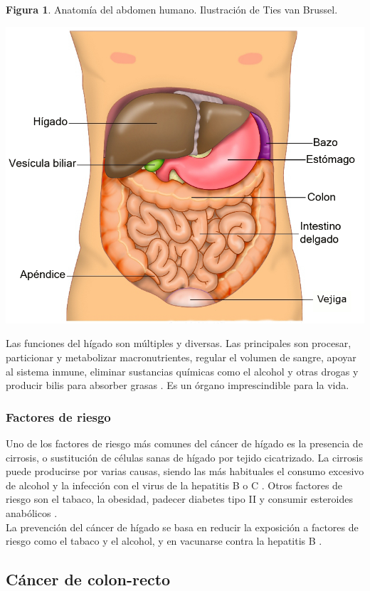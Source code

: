 \newpage
\textbf{Figura 1}. Anatomía del abdomen humano. Ilustración de Ties van Brussel.
\begin{center}
\includegraphics[width=.70\textwidth]{figuras/anatomia_higado.png} \\
\end{center}

Las funciones del hígado son múltiples y diversas. Las principales son procesar, particionar y metabolizar macronutrientes, regular el volumen de sangre, apoyar al sistema inmune, eliminar sustancias químicas como el alcohol y otras drogas y producir bilis para absorber grasas \cite{Trefts2017}. Es un órgano imprescindible para la vida.

\subsubsection{Factores de riesgo}

Uno de los factores de riesgo más comunes del cáncer de hígado es la presencia de cirrosis, o sustitución de células sanas de hígado por tejido cicatrizado. La cirrosis puede producirse por varias causas, siendo las más habituales el consumo excesivo de alcohol y la infección con el virus de la hepatitis B o C \cite{AmericanCancerSociety2019}. Otros factores de riesgo son el tabaco, la obesidad, padecer diabetes tipo II y consumir esteroides anabólicos \cite{AmericanCancerSociety2019, Marrero2005}.\\

La prevención del cáncer de hígado se basa en reducir la exposición a factores de riesgo como el tabaco y el alcohol, y en vacunarse contra la hepatitis B \cite{AmericanCancerSociety2019}.


\subsection{Cáncer de colon-recto}

